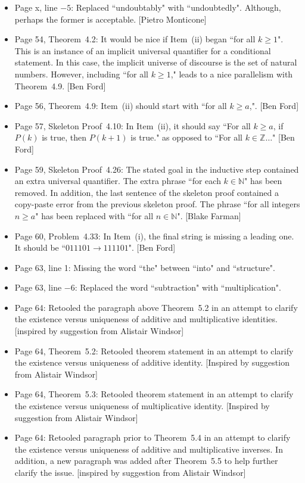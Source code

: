 \documentclass[11pt]{article}%
\begin{document}
\begin{itemize}
\item Page x, line $-5$: Replaced ``undoubtably" with ``undoubtedly". Although, perhaps the former is acceptable. [Pietro Monticone]
\item Page 54, Theorem~4.2: It would be nice if Item~(ii) began ``for all $k\geq 1$".  This is an instance of an implicit universal quantifier for a conditional statement.  In this case, the implicit universe of discourse is the set of natural numbers.  However, including ``for all $k\geq 1$," leads to a nice parallelism with Theorem~4.9. [Ben Ford]
\item Page 56, Theorem~4.9: Item~(ii) should start with ``for all $k\geq a$,". [Ben Ford]
\item Page 57, Skeleton Proof~4.10: In Item~(ii), it should say ``For all $k\geq a$, if $P(k)$ is true, then $P(k+1)$ is true." as opposed to ``For all $k\in\mathbb{Z}\ldots$" [Ben Ford]
\item Page 59, Skeleton Proof~4.26: The stated goal in the inductive step contained an extra universal quantifier.  The extra phrase ``for each $k \in \mathbb{N}$" has been removed.  In addition, the last sentence of the skeleton proof contained a copy-paste error from the previous skeleton proof.  The phrase ``for all integers $n \ge a$" has been replaced with ``for all $n\in\mathbb{N}$". [Blake Farman]
\item Page 60, Problem~4.33: In Item~(i), the final string is missing a leading one.  It should be ``$011101 \to 111101$". [Ben Ford]
\item Page 63, line 1: Missing the word ``the" between ``into" and ``structure".
\item Page 63, line $-6$: Replaced the word ``subtraction" with ``multiplication". 
\item Page 64: Retooled the paragraph above Theorem~5.2 in an attempt to clarify the existence versus uniqueness of additive and multiplicative identities. [inspired by suggestion from Alistair Windsor]
\item Page 64, Theorem~5.2: Retooled theorem statement in an attempt to clarify the existence versus uniqueness of additive identity. [Inspired by suggestion from Alistair Windsor]
\item Page 64, Theorem~5.3: Retooled theorem statement in an attempt to clarify the existence versus uniqueness of multiplicative identity. [Inspired by suggestion from Alistair Windsor]
\item Page 64: Retooled paragraph prior to Theorem~5.4 in an attempt to clarify the existence versus uniqueness of additive and multiplicative inverses. In addition, a new paragraph was added after Theorem~5.5 to help further clarify the issue. [inspired by suggestion from Alistair Windsor]

\end{itemize}
\end{document}
